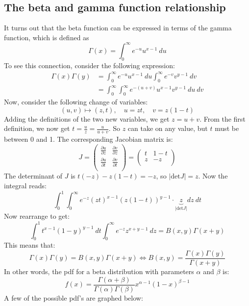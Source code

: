 \documentclass[12pt, a4paper]{article}
\begin{document}
\subsection{The beta and gamma function relationship}
It turns out that the beta function can be expressed in terms of the gamma function, which is defined as
\begin{equation}
\label{gamma}
\Gamma(x)=\int_0^\infty e^{-u}u^{x-1}\ du
\end{equation}
To see this connection, consider the following expression:
\begin{align}
\Gamma(x)\Gamma(y)&=\int_0^\infty e^{-u}u^{x-1}\ du\int_0^\infty e^{-v}v^{y-1}\ dv\\
&=\int_0^\infty\int_0^\infty e^{-(u+v)}u^{x-1}v^{y-1}\ du\ dv
\end{align}
Now, consider the following change of variables:
\begin{equation}
(u,v)\mapsto(z,t),\quad u=zt,\quad v=z(1-t)
\end{equation}
Adding the definitions of the two new variables, we get $z=u+v$. From the first definition, we now get $t=\frac{u}{z}=\frac{u}{u+v}$. So $z$ can take on any value, but $t$ must be between 0 and 1. The corresponding Jacobian matrix is:
\begin{equation}
J=\begin{pmatrix}
\frac{\partial u}{\partial z}	& \frac{\partial v}{\partial z} \\
\frac{\partial u}{\partial t}	& \frac{\partial v}{\partial t} \\
\end{pmatrix}
=\begin{pmatrix}
t	& 1-t \\
z	& -z \\
\end{pmatrix}
\end{equation}
The determinant of $J$ is $t(-z)-z(1-t)=-z$, so $|\textrm{det}J|=z$. Now the integral reads:
\begin{equation}
\int_0^1\int_0^\infty e^{-z}(zt)^{x-1}(z(1-t))^{y-1}\cdot\underbrace{z}_{|\textrm{det}J|} dz\ dt
\end{equation}
Now rearrange to get:
\begin{equation}
\int_0^1 t^{x-1}(1-y)^{y-1}\ dt\int_0^\infty e^{-z}z^{x+y-1}\ dz=B(x,y)\Gamma(x+y)
\end{equation}
This means that:
\begin{equation}
\Gamma(x)\Gamma(y)=B(x,y)\Gamma(x+y)\Leftrightarrow B(x,y)=\frac{\Gamma(x)\Gamma(y)}{\Gamma(x+y)}
\end{equation}
In other words, the pdf for a beta distribution with parameters $\alpha$ and $\beta$ is:
\begin{equation}
\label{pdf3}
f(x)=\frac{\Gamma(\alpha+\beta)}{\Gamma(\alpha)\Gamma(\beta)} x^{\alpha-1}(1-x)^{\beta-1}
\end{equation}
A few of the possible pdf's are graphed below:
\end{document}
